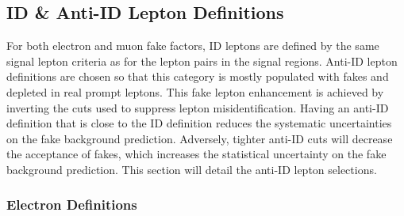 \fi
 \FloatBarrier
 
 \subsection{ID \& Anti-ID Lepton Definitions}
For both electron and muon fake factors, ID leptons are defined by the same signal lepton criteria as for the lepton pairs in the signal regions.  Anti-ID lepton definitions are chosen so that this category is mostly populated with fakes and depleted in real prompt leptons.  This fake lepton enhancement is achieved by inverting the cuts used to suppress lepton misidentification.  Having an anti-ID definition that is close to the ID definition reduces the systematic uncertainties on the fake background prediction.  Adversely, tighter anti-ID cuts will decrease the acceptance of fakes, which increases the statistical uncertainty on the fake background prediction.  This section will detail the anti-ID lepton selections. 

\subsubsection{Electron Definitions}

